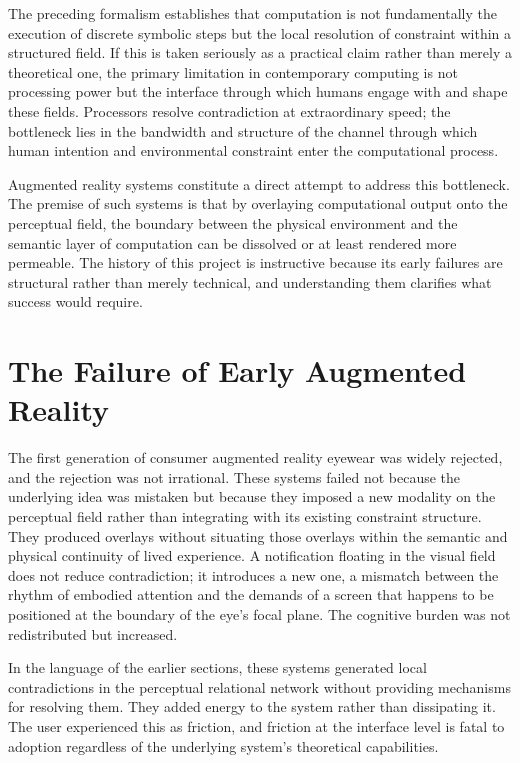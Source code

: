 \documentclass[12pt,a4paper,openany]{book}
\theoremstyle{plain}
\theoremstyle{definition}
\theoremstyle{remark}
\begin{document}
The preceding formalism establishes that computation is not fundamentally the execution of discrete symbolic steps but the local resolution of constraint within a structured field. If this is taken seriously as a practical claim rather than merely a theoretical one, the primary limitation in contemporary computing is not processing power but the interface through which humans engage with and shape these fields. Processors resolve contradiction at extraordinary speed; the bottleneck lies in the bandwidth and structure of the channel through which human intention and environmental constraint enter the computational process.

Augmented reality systems constitute a direct attempt to address this bottleneck. The premise of such systems is that by overlaying computational output onto the perceptual field, the boundary between the physical environment and the semantic layer of computation can be dissolved or at least rendered more permeable. The history of this project is instructive because its early failures are structural rather than merely technical, and understanding them clarifies what success would require.

\section{The Failure of Early Augmented Reality}

The first generation of consumer augmented reality eyewear was widely rejected, and the rejection was not irrational. These systems failed not because the underlying idea was mistaken but because they imposed a new modality on the perceptual field rather than integrating with its existing constraint structure. They produced overlays without situating those overlays within the semantic and physical continuity of lived experience. A notification floating in the visual field does not reduce contradiction; it introduces a new one, a mismatch between the rhythm of embodied attention and the demands of a screen that happens to be positioned at the boundary of the eye's focal plane. The cognitive burden was not redistributed but increased.

In the language of the earlier sections, these systems generated local contradictions in the perceptual relational network without providing mechanisms for resolving them. They added energy to the system rather than dissipating it. The user experienced this as friction, and friction at the interface level is fatal to adoption regardless of the underlying system's theoretical capabilities.
\end{document}
